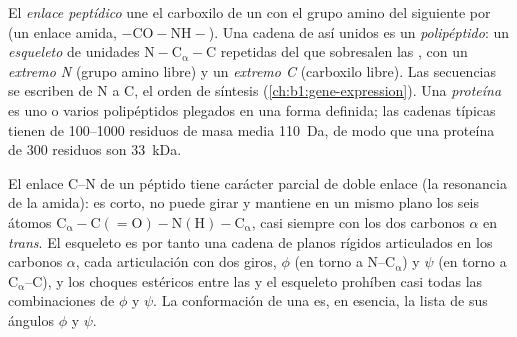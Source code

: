 \begin{definition}\label{def:b1:proteins:peptide}
El \emph{enlace peptídico} une el carboxilo de un
 con el grupo amino del siguiente por  (un enlace
amida, $\mathrm{-CO{-}NH-}$). Una cadena de  así unidos es un
\emph{polipéptido}: un \emph{esqueleto} de unidades
$\mathrm{N{-}C_\alpha{-}C}$ repetidas del que sobresalen las , con un \emph{extremo N} (grupo amino libre) y un \emph{extremo C}
(carboxilo libre). Las secuencias se escriben de N a C, el orden de síntesis
(\cref{ch:b1:gene-expression}). Una \emph{proteína} es uno o
varios polipéptidos plegados en una forma definida; las cadenas típicas
tienen de \qtyrange{100}{1000}{} residuos de masa media \qty{110}{Da}, de
modo que una proteína de \qty{300}{} residuos son \qty{33}{kDa}.
\end{definition}

\begin{proposition}\label{prop:b1:proteins:geometry}
El enlace C--N de un péptido tiene carácter parcial de doble enlace (la
resonancia de la amida): es corto, no puede girar y mantiene en un mismo
plano los seis átomos $\mathrm{C_\alpha{-}C(=O){-}N(H){-}C_\alpha}$, casi
siempre con los dos carbonos $\alpha$ en \emph{trans}. El esqueleto es por
tanto una cadena de planos rígidos articulados en los carbonos $\alpha$,
cada articulación con dos giros, $\phi$ (en torno a
N--$\mathrm{C_\alpha}$) y $\psi$ (en torno a $\mathrm{C_\alpha}$--C), y los
choques estéricos entre las  y el esqueleto prohíben casi
todas las combinaciones de $\phi$ y $\psi$. La conformación de una 
es, en esencia, la lista de sus ángulos $\phi$ y $\psi$.
\end{proposition}

